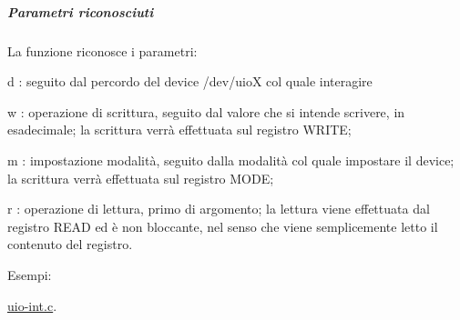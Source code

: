 \subparagraph*{Parametri riconosciuti}

La funzione riconosce i parametri\+:
\begin{DoxyItemize}
\item \textquotesingle{}d\textquotesingle{} \+: seguito dal percordo del device /dev/uioX col quale interagire
\item \textquotesingle{}w\textquotesingle{} \+: operazione di scrittura, seguito dal valore che si intende scrivere, in esadecimale; la scrittura verrà effettuata sul registro W\+R\+I\+TE;
\item \textquotesingle{}m\textquotesingle{} \+: impostazione modalità, seguito dalla modalità col quale impostare il device; la scrittura verrà effettuata sul registro M\+O\+DE;
\item \textquotesingle{}r\textquotesingle{} \+: operazione di lettura, primo di argomento; la lettura viene effettuata dal registro R\+E\+AD ed è non bloccante, nel senso che viene semplicemente letto il contenuto del registro.
\end{DoxyItemize}\begin{Desc}
\item[Esempi\+: ]\par
\hyperlink{uio-int_8c-example}{uio-\/int.\+c}.\end{Desc}
